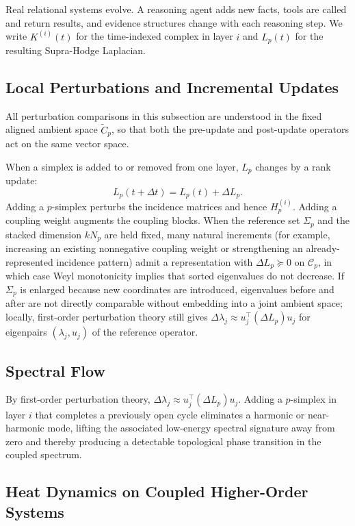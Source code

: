 \documentclass[11pt]{article}
\theoremstyle{definition}
\theoremstyle{remark}
\newcommand{\Ctil}{\widetilde{C}}
\newcommand{\calC}{\mathcal{C}}
\begin{document}
Real relational systems evolve. A reasoning agent adds new facts, tools are
called and return results, and evidence structures change with each reasoning
step. We write $K^{(i)}(t)$ for the time-indexed complex in layer $i$ and
$L_p(t)$ for the resulting Supra-Hodge Laplacian.

\subsection{Local Perturbations and Incremental Updates}

All perturbation comparisons in this subsection are understood in the fixed
aligned ambient space $\Ctil_p$, so that both the pre-update and post-update
operators act on the same vector space.

When a simplex is added to or removed from one layer, $L_p$ changes by a rank
update:
\[
  L_p(t+\Delta t) = L_p(t) + \Delta L_p.
\]
Adding a $p$-simplex perturbs the incidence matrices and hence $H_p^{(i)}$. Adding
a coupling weight augments the coupling blocks. When the reference set $\Sigma_p$
and the stacked dimension $kN_p$ are held fixed, many natural increments (for
example, increasing an existing nonnegative coupling weight or strengthening an
already-represented incidence pattern) admit a representation with
$\Delta L_p\succeq 0$ on $\calC_p$, in which case Weyl monotonicity implies that
sorted eigenvalues do not decrease. If $\Sigma_p$ is enlarged because new
coordinates are introduced, eigenvalues before and after are not directly
comparable without embedding into a joint ambient space; locally, first-order
perturbation theory still gives $\Delta\lambda_j \approx u_j^\top(\Delta L_p)u_j$
for eigenpairs $(\lambda_j,u_j)$ of the reference operator.

\subsection{Spectral Flow}

By first-order perturbation theory, $\Delta\lambda_j \approx u_j^\top(\Delta L_p)u_j$.
Adding a $p$-simplex in layer $i$ that completes a previously open cycle eliminates a harmonic or near-harmonic mode, lifting the associated low-energy spectral signature away from zero and thereby producing a detectable topological phase transition in the coupled spectrum.

\subsection{Heat Dynamics on Coupled Higher-Order Systems}
\end{document}
